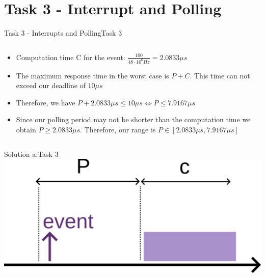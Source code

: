 
\section{Task 3 - Interrupt and Polling}

\setcounter{task}{1}

\begin{frame}[fragile]{Task 3 - Interrupts and Polling}{Task 3}
  \begin{solution}
    \begin{columns}
      \begin{column}{0.8\textwidth}
        \begin{itemize}
          \item Computation time C for the event: $\frac{100}{48 \cdot 10^6 Hz} = 2.0833\mu s$
          \item The maximum response time in the worst case is $P + C$. This time can not exceed our deadline of $10 \mu s$
          \item Therefore, we have $P + 2.0833\mu s \leq 10\mu s \Longleftrightarrow P \leq 7.9167\mu s$
          \item Since our polling period may not be shorter than the computation time we obtain $P \geq 2.0833\mu s$. Therefore, our range is $P \in [2.0833\mu s, 7.9167\mu s]$
        \end{itemize}
      \end{column}
    \end{columns}
  \end{solution}
\end{frame}

\begin{frame}{Solution a:}{Task 3}
  \centering
  \includegraphics[height=0.4\paperheight]{figures/task3-a.png}
\end{frame}


